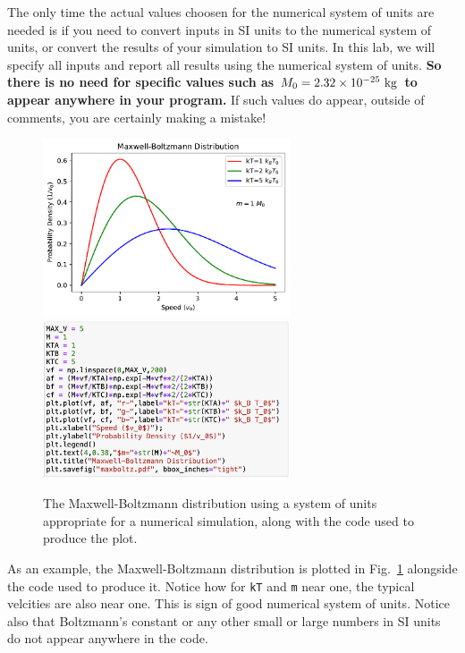 The only time the actual values choosen for the numerical system of
units are needed is if you need to convert inputs in SI units to the
numerical system of units, or convert the results of your simulation
to SI units.  In this lab, we will specify all inputs and report all
results using the numerical system of units.  {\bf So there is no need for
specific values such as $M_0 = 2.32 \times 10^{-25}~\rm kg$ to appear
anywhere in your program.}  If such values do appear, outside of
comments, you are certainly making a mistake!

\begin{figure}[htbp]
\begin{center}
\includegraphics[width=0.65\textwidth]{figs/maxwellboltzman/maxboltz.pdf} \\
\includegraphics[width=0.65\textwidth]{figs/maxwellboltzman/maxboltz-code.png} \\
\caption{The Maxwell-Boltzmann distribution using a system of units appropriate for a numerical simulation, along with the code used to produce the plot.}
\label{fig:mbdist}
\end{center}
\end{figure}

As an example, the Maxwell-Boltzmann distribution is plotted in
Fig.~\ref{fig:mbdist} alongside the code used to produce it.  Notice
how for {\tt kT} and {\tt m} near one, the typical velcities are also
near one.  This is sign of good numerical system of units.  Notice
also that Boltzmann's constant or any other small or large numbers in
SI units do not appear anywhere in the code. 

